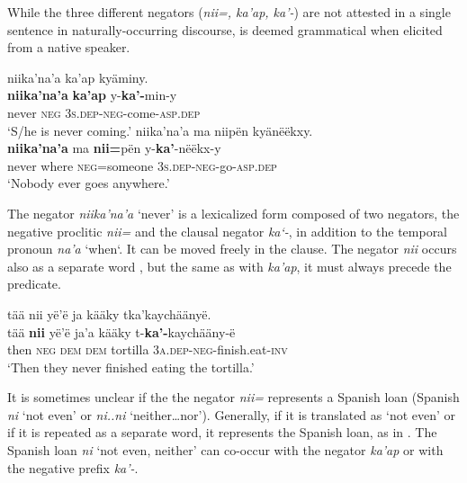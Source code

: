 \documentclass[output=paper,colorlinks,citecolor=brown,draft]{langscibook}
\begin{document}
While the three different negators (\textit{nii=, ka’ap, ka’-}) are not attested in a single sentence in naturally\nobreakdash-occurring discourse,  is deemed grammatical when elicited from a native speaker. 

\ea\label{ex:mix:107}
    \ea\label{ex:mix:107a}
        \glll niika’na’a ka’ap kyäminy. \\ 
              \textbf{niika’na’a} \textbf{ka’ap} y-\textbf{ka’-}min-y\\
              never \textsc{neg} \textsc{3s.dep}{}-\textsc{neg-}come-\textsc{asp.dep} \\
        \glt ‘S/he is never coming.’
    \ex\label{ex:mix:107b}
        \glll niika’na’a ma niipën kyänëëkxy.\\
             \textbf{niika’na’a} ma \textbf{nii=}pën y-\textbf{ka’}{}-nëëkx-y\\
             never where \textsc{neg}=someone \textsc{3s.dep-neg}{}-go{}-\textsc{asp.dep}\\
        \glt ‘Nobody ever goes anywhere.’
    \z
\z 

The negator \textit{niika’na’a} ‘never’ is a lexicalized form composed of two negators, the negative proclitic \textit{nii=} and the clausal negator \textit{ka‘-}, in addition to the temporal pronoun \textit{na’a} ‘when‘. It can be moved freely in the clause. The negator \textit{nii} occurs also as a separate word , but the same as with \textit{ka’ap}, it must always precede the predicate.

\ea\label{ex:mix:108}
    \glll tää nii yë’ë ja kääky tka’kaychäänyë.\\
          tää \textbf{nii} yë’ë ja’a kääky t-\textbf{ka’-}kaychääny-ë\\
          then \textsc{neg} \textsc{dem} \textsc{dem} tortilla 3\textsc{a.dep-neg}{}-finish.eat-\textsc{inv}\\
    \glt ‘Then they never finished eating the tortilla.’
\z

It is sometimes unclear if the the negator \textit{nii=} represents a Spanish loan (Spanish \textit{ni} ‘not even’ or \textit{ni..ni} ‘neither…nor’). Generally, if it is translated as ‘not even’ or if it is repeated as a separate word, it represents the Spanish loan, as in . The Spanish loan \textit{ni} ‘not even, neither’ can co\nobreakdash-occur with the negator \textit{ka’ap} or with the negative prefix \textit{ka’-}.
\end{document}
